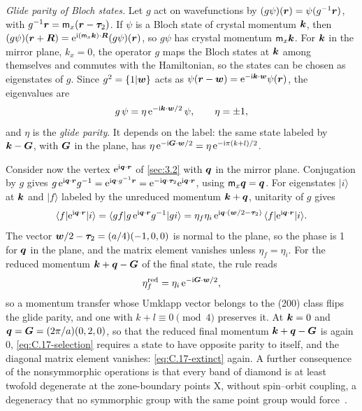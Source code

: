 \emph{Glide parity of Bloch states.} Let $g$ act on wavefunctions by $(g\psi)(\bm{r}) = \psi(g^{-1}\bm{r})$, with $g^{-1}\bm{r} = \mathsf{m}_x(\bm{r} - \bm{\tau}_2)$. If $\psi$ is a Bloch state of crystal momentum $\bm{k}$, then $(g\psi)(\bm{r} + \bm{R}) = \mathrm{e}^{\mathrm{i}(\mathsf{m}_x\bm{k})\cdot\bm{R}}(g\psi)(\bm{r})$, so $g\psi$ has crystal momentum $\mathsf{m}_x\bm{k}$. For $\bm{k}$ in the mirror plane, $k_x = 0$, the operator $g$ maps the Bloch states at $\bm{k}$ among themselves and commutes with the Hamiltonian, so the states can be chosen as eigenstates of $g$. Since $g^2 = \{1|\bm{w}\}$ acts as $\psi(\bm{r} - \bm{w}) = \mathrm{e}^{-\mathrm{i}\bm{k}\cdot\bm{w}}\psi(\bm{r})$, the eigenvalues are
\begin{equation}
  g\,\psi = \eta\,\mathrm{e}^{-\mathrm{i}\bm{k}\cdot\bm{w}/2}\,\psi, \qquad \eta = \pm1 ,
  \label{eq:C.17-parity}
\end{equation}
and $\eta$ is the \emph{glide parity}. It depends on the label: the same state labeled by $\bm{k} - \bm{G}$, with $\bm{G}$ in the plane, has $\eta\,\mathrm{e}^{-\mathrm{i}\bm{G}\cdot\bm{w}/2} = \eta\,\mathrm{e}^{-\mathrm{i}\pi(k + l)/2}$.

Consider now the vertex $\mathrm{e}^{\mathrm{i}\bm{q}\cdot\bm{r}}$ of \cref{sec:3.2} with $\bm{q}$ in the mirror plane. Conjugation by $g$ gives $g\,\mathrm{e}^{\mathrm{i}\bm{q}\cdot\bm{r}}g^{-1} = \mathrm{e}^{\mathrm{i}\bm{q}\cdot g^{-1}\bm{r}} = \mathrm{e}^{-\mathrm{i}\bm{q}\cdot\bm{\tau}_2}\mathrm{e}^{\mathrm{i}\bm{q}\cdot\bm{r}}$, using $\mathsf{m}_x\bm{q} = \bm{q}$. For eigenstates $|i\rangle$ at $\bm{k}$ and $|f\rangle$ labeled by the unreduced momentum $\bm{k} + \bm{q}$, unitarity of $g$ gives
\begin{equation*}
  \langle f|\mathrm{e}^{\mathrm{i}\bm{q}\cdot\bm{r}}|i\rangle = \langle gf|g\,\mathrm{e}^{\mathrm{i}\bm{q}\cdot\bm{r}}g^{-1}|gi\rangle
  = \eta_f\eta_i\,\mathrm{e}^{\mathrm{i}\bm{q}\cdot(\bm{w}/2 - \bm{\tau}_2)}\,\langle f|\mathrm{e}^{\mathrm{i}\bm{q}\cdot\bm{r}}|i\rangle .
\end{equation*}
The vector $\bm{w}/2 - \bm{\tau}_2 = (a/4)(-1, 0, 0)$ is normal to the plane, so the phase is 1 for $\bm{q}$ in the plane, and the matrix element vanishes unless $\eta_f = \eta_i$. For the reduced momentum $\bm{k} + \bm{q} - \bm{G}$ of the final state, the rule reads
\begin{equation}
  \eta_f^{\mathrm{red}} = \eta_i\,\mathrm{e}^{-\mathrm{i}\bm{G}\cdot\bm{w}/2} ,
  \label{eq:C.17-selection}
\end{equation}
so a momentum transfer whose Umklapp vector belongs to the (200) class flips the glide parity, and one with $k + l \equiv 0 \pmod 4$ preserves it. At $\bm{k} = 0$ and $\bm{q} = \bm{G} = (2\pi/a)(0, 2, 0)$, so that the reduced final momentum $\bm{k} + \bm{q} - \bm{G}$ is again 0, \cref{eq:C.17-selection} requires a state to have opposite parity to itself, and the diagonal matrix element vanishes: \cref{eq:C.17-extinct} again. A further consequence of the nonsymmorphic operations is that every band of diamond is at least twofold degenerate at the zone-boundary points $\mathrm{X}$, without spin--orbit coupling, a degeneracy that no symmorphic group with the same point group would force~\cite{dresselhaus2008group}.
